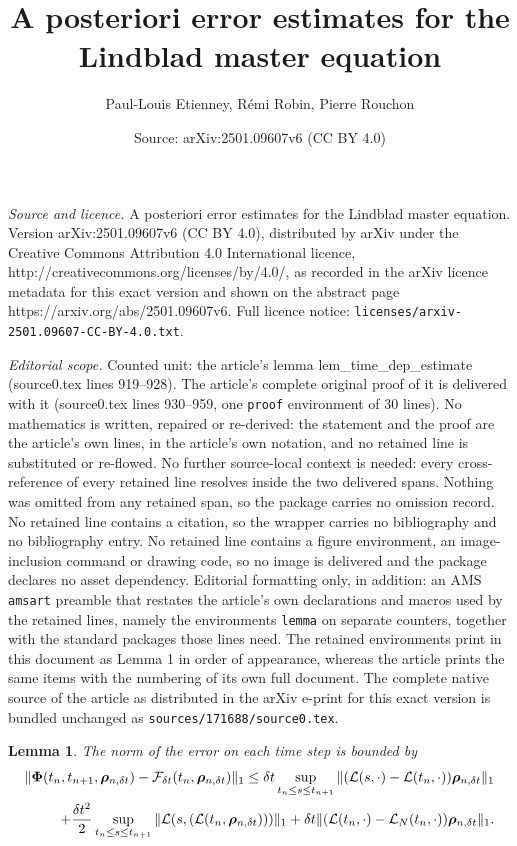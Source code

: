 \documentclass[10pt,a4paper]{amsart}
\title{A posteriori error estimates for the Lindblad master equation}
\author{Paul-Louis Etienney, R\'emi Robin, Pierre Rouchon}
\date{Source: arXiv:2501.09607v6 (CC BY 4.0)}
\newtheorem{lemma}{Lemma}
\newcommand{\xF}{\mathcal{F}}
\newcommand{\xL}{\mathcal{L}}
\begin{document}
\maketitle

\noindent\emph{Source and licence.} A posteriori error estimates for the Lindblad master equation. Version arXiv:2501.09607v6 (CC BY 4.0), distributed by arXiv under the Creative Commons Attribution 4.0 International licence, http://creativecommons.org/licenses/by/4.0/, as recorded in the arXiv licence metadata for this exact version and shown on the abstract page https://arxiv.org/abs/2501.09607v6. Full licence notice: \texttt{licenses/arxiv-2501.09607-CC-BY-4.0.txt}.\par\smallskip

\noindent\textit{Editorial scope.} Counted unit: the article's lemma lem\_time\_dep\_estimate (source0.tex lines 919--928). The article's complete original proof of it is delivered with it (source0.tex lines 930--959, one \texttt{proof} environment of 30 lines). No mathematics is written, repaired or re-derived: the statement and the proof are the article's own lines, in the article's own notation, and no retained line is substituted or re-flowed.  No further source-local context is needed: every cross-reference of every retained line resolves inside the two delivered spans.  Nothing was omitted from any retained span, so the package carries no omission record.  No retained line contains a citation, so the wrapper carries no bibliography and no bibliography entry.  No retained line contains a figure environment, an image-inclusion command or drawing code, so no image is delivered and the package declares no asset dependency.  Editorial formatting only, in addition: an AMS \texttt{amsart} preamble that restates the article's own declarations and macros used by the retained lines, namely the environments \texttt{lemma} on separate counters, together with the standard packages those lines need.  The retained environments print in this document as Lemma 1 in order of appearance, whereas the article prints the same items with the numbering of its own full document.  The complete native source of the article as distributed in the arXiv e-print for this exact version is bundled unchanged as \texttt{sources/171688/source0.tex}.
\begin{lemma}
    \label{lem_time_dep_estimate}
    The norm of the error on each time step is bounded by
    \begin{align}
        \label{eq_lem_time_dep_estimate}
        \notag
        \|\boldsymbol{\Phi}(t_n,t_{n+1},\boldsymbol{\rho}_{n,\delta t})- \xF_{\delta t}(t_n,\boldsymbol{\rho}_{n,\delta t})\|_1 \leq \delta t \sup_{t_n \leq s \leq t_{n+1}} \| (\xL(s,\cdot)-\xL(t_n,\cdot))\boldsymbol{\rho}_{n,\delta t}\|_1 \\
        + \frac{\delta t ^2}{2} \sup_{t_n \leq s \leq t_{n+1}} \|\xL(s,(\xL(t_n,\boldsymbol{\rho}_{n,\delta t})))\|_1+ \delta t \|(\xL(t_n,\cdot)-\xL_N(t_n,\cdot))\boldsymbol{\rho}_{n,\delta t}\|_1.
    \end{align}
\end{lemma}
\end{document}
